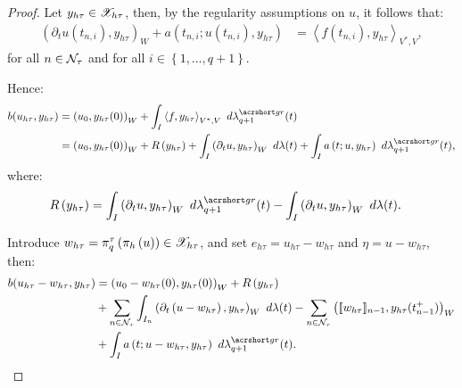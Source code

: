 \begin{proof}
    Let $y_{h \tau} \in \mathscr{X}_{h \tau}$, then, by the regularity assumptions on $u$, it follows that:
    \begin{align*}
        \left( \partial_t u(t_{n, i}), y_{h \tau} \right)_W + a \left( t_{n, i}; u(t_{n, i}), y_{h \tau} \right) &= \left\langle f(t_{n, i}), y_{h \tau} \right\rangle_{V^*, V},
    \end{align*}
    for all $n \in \mathcal{N}_{\tau}$ and for all $i \in \left\{ 1, \dots, q + 1\right\}$.

    Hence:
    \begin{align*}
        b(u_{h \tau}, y_{h \tau}) &= \left( u_0, y_{h \tau}(0) \right)_W + \int_I \left\langle f, y_{h \tau} \right\rangle_{V^*, V} ~ d \lambdaGR_{q + 1}(t) \\
        &= \left( u_0, y_{h \tau}(0) \right)_W + \Remainder \left( y_{h \tau} \right) + \int_I \left( \partial_t u, y_{h \tau}\right)_W ~ d \lambda(t) + \int_I a \left( t; u, y_{h \tau}\right) ~ d \lambdaGR_{q + 1}(t),
    \end{align*}
    where:
    \begin{align*}
        \Remainder \left( y_{h \tau} \right) &= \int_I \left( \partial_t u, y_{h \tau}\right)_W ~ d \lambdaGR_{q + 1}(t) - \int_I \left( \partial_t u, y_{h \tau}\right)_W ~ d \lambda(t).
    \end{align*}

    Introduce $w_{h \tau} = \pi^{\tau}_q \left( \pi_h \left( u \right) \right) \in \mathscr{X}_{h \tau}$, and set $e_{h \tau} = u_{h \tau} - w_{h \tau}$ and $\eta = u - w_{h \tau}$, then:
    \begin{align*}
        b(u_{h \tau} - w_{h \tau}, y_{h \tau}) &= \left( u_0 - w_{h \tau}(0), y_{h \tau}(0) \right)_W + \Remainder \left( y_{h \tau} \right) \\
        &+ \sum_{n \in \TimeIndices} \int_{I_n} \left( \partial_t \left( u - w_{h \tau} \right), y_{h \tau}\right)_W ~ d \lambda(t) - \sum_{n \in \TimeIndices}  \left( \llbracket w_{h \tau} \rrbracket_{n - 1}, y_{h \tau}(t_{n - 1}^+) \right)_W \\
        &+ \int_I a \left( t; u - w_{h \tau}, y_{h \tau}\right) ~ d \lambdaGR_{q + 1}(t).
    \end{align*}


\end{proof}

